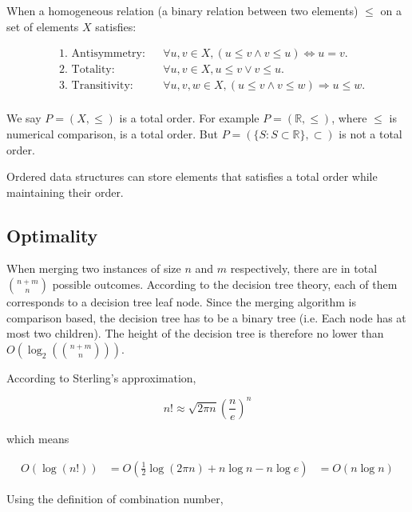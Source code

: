 \documentclass[12pt]{article}
\begin{document}
When a homogeneous relation (a binary relation between two elements) $\le$ on a set of elements $X$ satisfies:

\begin{align*}
&\text{1. Antisymmetry:} && \forall u, v \in X, (u \le v \land v \le u) \Leftrightarrow u = v. \\
&\text{2. Totality:} && \forall u, v \in X, u \le v \lor v \le u. \\
&\text{3. Transitivity:} && \forall u, v, w \in X, (u \le v \land v \le w) \Rightarrow u \le w.\\
\end{align*}

We say $P = (X, \le)$ is a total order. For example $P = (\mathbb{R}, \le)$, where $\le$ is numerical comparison, is a total order. But $P = (\{S: S\subset \mathbb{R}\}, \subset)$ is not a total order.

Ordered data structures can store elements that satisfies a total order while maintaining their order. 


\subsection{Optimality}
 
When merging two instances of size $n$ and $m$ respectively, there are in total $\binom{n+m}{n}$ possible outcomes. According to the decision tree theory, each of them corresponds to a decision tree leaf node. Since the merging algorithm is comparison based, the decision tree has to be a binary tree (i.e. Each node has at most two children). The height of the decision tree is therefore no lower than $O(\log_2({\binom{n+m}{n}}))$.

According to Sterling's approximation, 

\begin{equation}
    n!\approx \sqrt{2\pi n}(\frac{n}{e})^n
\end{equation}

which means

\begin{equation}
    \begin{aligned}
        O(\log(n!)) &= O(\frac{1}{2}\log(2\pi n) + n\log n - n\log e )
                    &= O(n\log n)
    \end{aligned}
\end{equation}

Using the definition of combination number, 
\end{document}
